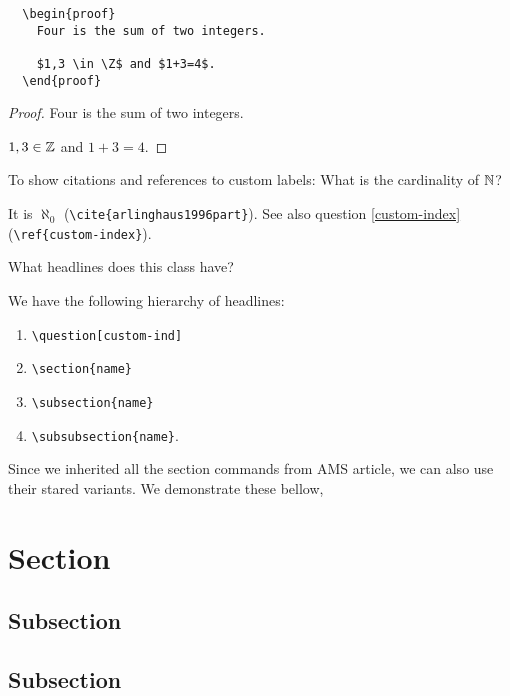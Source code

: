 \documentclass{homework}
\newcommand{\bk}{\textbackslash}
\begin{document}
\vspace*{1em}
\begin{minipage}{0.45\textwidth}
  \begin{verbatim}
  \begin{proof}
    Four is the sum of two integers.

    $1,3 \in \Z$ and $1+3=4$.
  \end{proof}
    \end{verbatim}
\end{minipage}
\hfill
\begin{minipage}{0.45\textwidth} \hspace{1.9em}
  \begin{proof}
    Four is the sum of two integers.

    $1,3 \in \mathbb{Z}$ and $1+3=4$.
  \end{proof}
\end{minipage}

\question\label{cardinality} To show citations and references to custom labels: What is the cardinality of $\mathbb{N}$?

It is $\aleph_0$ \cite{arlinghaus1996part} (\texttt{\bk cite\{arlinghaus1996part\}}). See also question \ref{custom-index} (\texttt{\bk ref\{custom-index\}}).

\question What headlines does this class have?

We have the following hierarchy of headlines:
\begin{enumerate}
  \item \texttt{\bk question[custom-ind]}
  \item \texttt{\bk section\{name\}}
  \item \texttt{\bk subsection\{name\}}
  \item \texttt{\bk subsubsection\{name\}}.
\end{enumerate}

Since we inherited all the section commands from AMS article, we can also use their stared variants. We demonstrate these bellow,
\section{Section}
\subsection{Subsection}
\subsection{Subsection}
\end{document}
